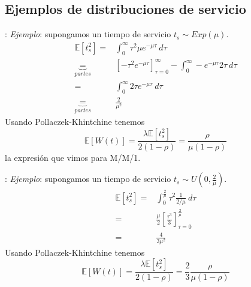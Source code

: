\documentclass[xcolor={x11names}]{beamer}
\begin{document}
\subsection{Ejemplos de distribuciones de servicio}
\begin{frame}{\secname: \subsecname}
    \textit{Ejemplo}: supongamos un tiempo
    de servicio $t_s\sim Exp(\mu)$.
    \begin{align*}
        \mathbb{E}[t_s^2]
        =& \int_0^\infty
        \tau^2 \mu e^{-\mu\tau}
        \ d\tau\\
        \underbrace{=}_{partes}&
        \left[-\tau^2e^{-\mu\tau} \right]_{\tau=0}^\infty
        -\int_0^\infty -e^{-\mu\tau}2\tau\ 
        d\tau\\
        =&\int_0^\infty
        2\tau e^{-\mu\tau}\ d\tau\\
        \underbrace{=}_{partes}&
        \frac{2}{\mu^2}
    \end{align*}
    Usando Pollaczek-Khintchine tenemos
    \begin{equation*}
        \mathbb{E}[W(t)]=
        \frac{\lambda\mathbb{E}[t_s^2]}{2(1-\rho)}
        =\frac{\rho}{\mu(1-\rho)}
    \end{equation*}
    la expresión que vimos para M/M/1.
\end{frame}






\begin{frame}{\secname: \subsecname}
    \textit{Ejemplo}: supongamos un tiempo
    de servicio $t_s\sim U(0,\frac{2}{\mu})$.
    \begin{align*}
        \mathbb{E}[t_s^2]
        =& \int_0^{\tfrac{2}{\mu}}
        \tau^2 \frac{1}{2/\mu}
        \ d\tau\\
        =& \frac{\mu}{2}\left[
            \frac{\tau^3}{3}
        \right]_{\tau=0}^{\tfrac{2}{\mu}}\\
        =& \frac{4}{3\mu^2}
    \end{align*}
    Usando Pollaczek-Khintchine tenemos
    \begin{equation*}
        \mathbb{E}[W(t)]=
        \frac{\lambda\mathbb{E}[t_s^2]}{2(1-\rho)}
        =\frac{2}{3}\frac{\rho}{\mu(1-\rho)}
    \end{equation*}
\end{frame}
\end{document}

